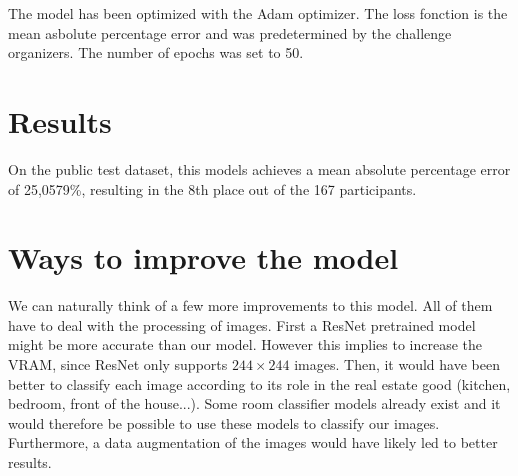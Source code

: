 \documentclass[11pt, a4paper, twocolumn]{article}
\begin{document}
The model has been optimized with the Adam optimizer. The loss fonction is the mean asbolute percentage error and was predetermined by the challenge organizers. The number of epochs was set to 50.

\section{Results}
On the public test dataset, this models achieves a mean absolute percentage error of 25,0579\%, resulting in the 8th place out of the 167 participants. 

\section{Ways to improve the model}

We can naturally think of a few more improvements to this model. All of them have to deal with the processing of images. First a ResNet pretrained model might be more accurate than our model. However this implies to increase the VRAM, since ResNet only supports $244 \times 244$ images. Then, it would have been better to classify each image according to its role in the real estate good (kitchen, bedroom, front of the house...). Some room classifier models already exist and it would therefore be possible to use these models to classify our images. Furthermore, a data augmentation of the images would have likely led to better results. 
\end{document}

